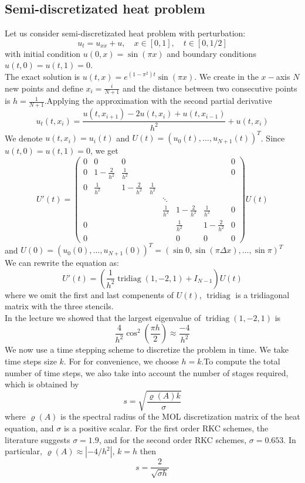 \documentclass{article}
\DeclareMathOperator{\tridiag}{tridiag}
\theoremstyle{theorem}
\theoremstyle{definition}
\begin{document}
	\subsection{Semi-discretizated heat problem}
	Let us consider semi-discretizated heat problem with perturbation:
	$$u_t=u_{xx}+u, \quad x \in \left[0,1\right], \quad t \in \left[0,1/2\right]$$ with initial condition $u(0,x)=\sin(\pi x)$ and boundary conditions $u(t,0)=u(t,1)=0$.\\
	The exact solution is $u(t,x)=e^{(1-\pi^2)t} \sin(\pi x)$. We create in the $x-$axis  $N$ new points and define $x_i = \frac{i}{N+1}$ and the distance between two consecutive points is $h = \frac{1}{N+1}$.Applying the  approximation with the second partial derivative $$u_t(t,x_i)= \frac{u(t,x_{i+1})-2u(t,x_i)+u(t,x_{i-1})}{h^2}+u(t,x_i)$$  We denote $u(t,x_i)=u_i(t)$ and $U(t)=(u_0(t), \dots , u_{N+1}(t))^T$. Since $u(t,0)=u(t,1)=0$, we get\\
	$$U'(t)=\begin{pmatrix}
	0&0&0  &  &  &  & &0 \\
	0&1-\frac{2}{h^2} &\frac{1}{h^2}  &  &  &  & & 0\\ 
	0&\frac{1}{h^2}& 1-\frac{2}{h^2} &\frac{1}{h^2}  &  &  &  &\\ 
	& &  &  & \ddots &  & &\\ 
	& &  &  & \frac{1}{h^2} & 1-\frac{2}{h^2} & \frac{1}{h^2}&0\\ 
	0& &  &  &  & \frac{1}{h^2} &1-\frac{2}{h^2} &0 \\
	0& &  &  &  &  0&0 &0 
	\end{pmatrix} U(t) $$
	and $U(0)=(u_0(0), \dots , u_{N+1}(0))^T= (\sin 0 , \sin (\pi \Delta x) , \dots , \sin \pi)^T$ \\
	We can rewrite the equation as:
	$$U'(t)=\left(\frac{1}{h^2}\tridiag(1,-2,1)+I_{N-1}\right) U(t)$$
	where we omit the first and last compenents of $U(t)$, $\tridiag$ is a tridiagonal matrix with the three stencils.\\
	In the lecture we showed that the largest eigenvalue of $\tridiag(1,-2,1)$ is $$\dfrac{4}{h^2} \cos^2 \left(\dfrac{\pi h }{2}\right) \approx \dfrac{-4}{h^2}$$
	We now use a time stepping scheme to discretize the problem in time. We take
	time steps size $k$. For for convenience, we choose $h=k$.To compute the total number of time steps, we also take into account the number of stages required, which is obtained by $$s=\sqrt{\dfrac{\varrho(A)k}{\sigma}}$$
	where $\varrho(A)$ is the spectral radius of the MOL discretization matrix of the heat equation, and $\sigma$ is a positive scalar. For the first order RKC schemes, the literature \cite{example4} suggests $\sigma = 1.9$, and for the second order RKC schemes, $\sigma = 0.653$. In particular, $\varrho(A) \approx \left|-4/h^2\right|$, $k=h$ then $$s=\frac{2}{\sqrt{\sigma h}}$$
\end{document}
